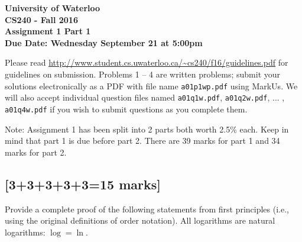 \documentclass[12pt]{article}
\begin{document}
\begin{center}
{\Large\bf University of Waterloo}\\
\vspace{3mm}
{\Large\bf CS240 - Fall 2016}\\
\vspace{2mm}
{\Large\bf Assignment 1 Part 1}\\
\vspace{3mm}
\textbf{Due Date: Wednesday September 21 at 5:00pm}
\end{center}

\def\question#1{\item[\bf #1.]}
\def\part#1{\item[\bf #1)]}
\newcommand{\pc}[1]{\mbox{\textbf{#1}}} %

Please read
\url{http://www.student.cs.uwaterloo.ca/~cs240/f16/guidelines.pdf}
for guidelines on submission.  Problems 1 -- 4 are written
problems; submit your solutions electronically as a PDF with file
name {\tt a01p1wp.pdf} using MarkUs. We will also accept individual
question files named {\tt a01q1w.pdf}, {\tt a01q2w.pdf}, ... , {\tt
a01q4w.pdf} if you wish to submit questions as you complete them.

Note: Assignment 1 has been split into 2 parts both worth 2.5\% each. 
Keep in mind that part 1 is due before part 2. 
There are 39 marks for part 1 and 34 marks for part 2. 
\subsection{[3+3+3+3+3=15 marks]}
Provide a complete proof of the following statements from first
principles (i.e., using the original definitions of order notation).
All logarithms are natural logarithms: $\log = \ln$.\\
\end{document}
